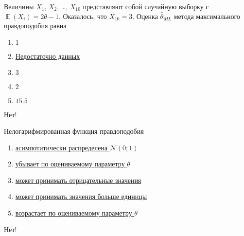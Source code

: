 \documentclass[t]{beamer}
\DeclareMathOperator{\E}{\mathbb{E}}
\newcommand{\cN}{\mathcal{N}}
\begin{document}
 \begin{frame} \label{14-No} 
\begin{block}{14} 

    Величины $X_1$, $X_2$, \ldots, $X_{10}$ представляют собой случайную выборку с $\E(X_i) = 2\theta - 1$. Оказалось, что $\bar X_{10}=3$. Оценка $\hat\theta_{ML}$ метода максимального правдоподобия равна
    

 \end{block} 
\begin{enumerate} 
\item[] \hyperlink{14-No}{\beamergotobutton{} $1$}
\item[] \hyperlink{14-Yes}{\beamergotobutton{} Недостаточно данных}
\item[] \hyperlink{14-No}{\beamergotobutton{} $3$}
\item[] \hyperlink{14-No}{\beamergotobutton{} $2$}
\item[] \hyperlink{14-No}{\beamergotobutton{} $15.5$}
\end{enumerate} 

 \alert{Нет!} 
\end{frame} 


 \begin{frame} \label{15-No} 
\begin{block}{15} 

  Нелогарифмированная функция правдоподобия
  

 \end{block} 
\begin{enumerate} 
\item[] \hyperlink{15-No}{\beamergotobutton{} асимпотитически распределена $\cN(0;1)$}
\item[] \hyperlink{15-No}{\beamergotobutton{} убывает по оцениваемому параметру $\theta$}
\item[] \hyperlink{15-No}{\beamergotobutton{} может принимать отрицательные значения}
\item[] \hyperlink{15-Yes}{\beamergotobutton{} может принимать значения больше единицы}
\item[] \hyperlink{15-No}{\beamergotobutton{} возрастает по оцениваемому параметру $\theta$}
\end{enumerate} 

 \alert{Нет!} 
\end{frame} 
\end{document}
